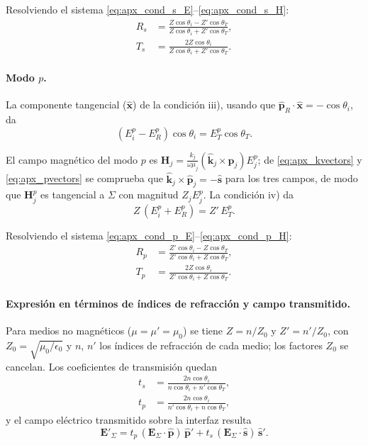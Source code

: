 Resolviendo el sistema \eqref{eq:apx_cond_s_E}--\eqref{eq:apx_cond_s_H}:
\begin{align}
R_s &= \frac{Z\cos\theta_i - Z'\cos\theta_T}{Z\cos\theta_i + Z'\cos\theta_T},
\label{eq:apx_fresnel_rs}\\
T_s &= \frac{2Z\cos\theta_i}{Z\cos\theta_i + Z'\cos\theta_T}.
\label{eq:apx_fresnel_ts}
\end{align}

\paragraph{Modo $p$.}

La componente tangencial ($\hat{\mathbf{x}}$) de la condición iii), usando que $\hat{\mathbf{p}}_R\cdot\hat{\mathbf{x}} = -\cos\theta_i$, da
\begin{equation}
(E_i^p - E_R^p)\cos\theta_i = E_T^p\cos\theta_T.
\label{eq:apx_cond_p_E}
\end{equation}

El campo magnético del modo $p$ es $\mathbf{H}_j = \frac{k_j}{\omega\mu_j}(\hat{\mathbf{k}}_j \times \hat{\mathbf{p}}_j)E_j^p$; de \eqref{eq:apx_kvectors} y \eqref{eq:apx_pvectors} se comprueba que $\hat{\mathbf{k}}_j\times\hat{\mathbf{p}}_j = -\hat{\mathbf{s}}$ para los tres campos, de modo que $\mathbf{H}_j^p$ es tangencial a $\Sigma$ con magnitud $Z_j E_j^p$. La condición iv) da
\begin{equation}
Z\,(E_i^p + E_R^p) = Z'\,E_T^p.
\label{eq:apx_cond_p_H}
\end{equation}

Resolviendo el sistema \eqref{eq:apx_cond_p_E}--\eqref{eq:apx_cond_p_H}:
\begin{align}
R_p &= \frac{Z'\cos\theta_i - Z\cos\theta_T}{Z'\cos\theta_i + Z\cos\theta_T},
\label{eq:apx_fresnel_rp}\\
T_p &= \frac{2Z\cos\theta_i}{Z'\cos\theta_i + Z\cos\theta_T}.
\label{eq:apx_fresnel_tp}
\end{align}

\paragraph{Expresión en términos de índices de refracción y campo transmitido.}

Para medios no magnéticos ($\mu = \mu' = \mu_0$) se tiene $Z = n/Z_0$ y $Z' = n'/Z_0$, con $Z_0 = \sqrt{\mu_0/\epsilon_0}$ y $n$, $n'$ los índices de refracción de cada medio; los factores $Z_0$ se cancelan. Los coeficientes de transmisión quedan
\begin{align}
t_s &= \frac{2n\cos\theta_i}{n\cos\theta_i + n'\cos\theta_T},
\label{eq:apx_fresnel_ts_n}\\
t_p &= \frac{2n\cos\theta_i}{n'\cos\theta_i + n\cos\theta_T},
\label{eq:apx_fresnel_tp_n}
\end{align}
y el campo eléctrico transmitido sobre la interfaz resulta
\begin{equation}
\mathbf{E}'_\Sigma
= t_p\,(\mathbf{E}_\Sigma\cdot\hat{\mathbf{p}})\,\hat{\mathbf{p}}'
+ t_s\,(\mathbf{E}_\Sigma\cdot\hat{\mathbf{s}})\,\hat{\mathbf{s}}'.
\label{eq:apx_E_transmitido_Sigma}
\end{equation}
